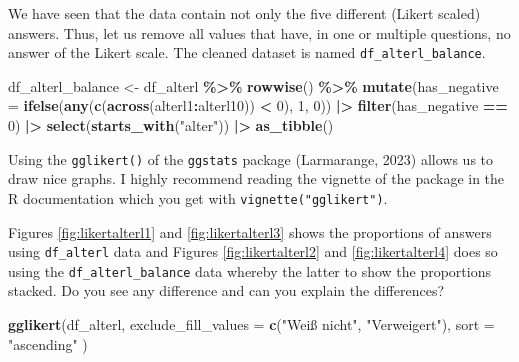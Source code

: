 \documentclass[
  doc]{apa6}
\newenvironment{Shaded}{\begin{snugshade}}{\end{snugshade}}
\newcommand{\AttributeTok}[1]{\textcolor[rgb]{0.13,0.29,0.53}{#1}}
\newcommand{\DecValTok}[1]{\textcolor[rgb]{0.00,0.00,0.81}{#1}}
\newcommand{\FunctionTok}[1]{\textcolor[rgb]{0.13,0.29,0.53}{\textbf{#1}}}
\newcommand{\NormalTok}[1]{#1}
\newcommand{\OtherTok}[1]{\textcolor[rgb]{0.56,0.35,0.01}{#1}}
\newcommand{\SpecialCharTok}[1]{\textcolor[rgb]{0.81,0.36,0.00}{\textbf{#1}}}
\newcommand{\StringTok}[1]{\textcolor[rgb]{0.31,0.60,0.02}{#1}}
\begin{document}
We have seen that the data contain not only the five different (Likert scaled) answers. Thus, let us remove all values that have, in one or multiple questions, no answer of the Likert scale. The cleaned dataset is named \texttt{df\_alterl\_balance}.

\begin{Shaded}
\begin{Highlighting}[]
\NormalTok{df\_alterl\_balance }\OtherTok{\textless{}{-}}\NormalTok{ df\_alterl }\SpecialCharTok{\%\textgreater{}\%}
  \FunctionTok{rowwise}\NormalTok{() }\SpecialCharTok{\%\textgreater{}\%}
  \FunctionTok{mutate}\NormalTok{(}\AttributeTok{has\_negative =} \FunctionTok{ifelse}\NormalTok{(}\FunctionTok{any}\NormalTok{(}\FunctionTok{c}\NormalTok{(}\FunctionTok{across}\NormalTok{(alterl1}\SpecialCharTok{:}\NormalTok{alterl10)) }\SpecialCharTok{\textless{}} \DecValTok{0}\NormalTok{), }\DecValTok{1}\NormalTok{, }\DecValTok{0}\NormalTok{)) }\SpecialCharTok{|\textgreater{}} 
  \FunctionTok{filter}\NormalTok{(has\_negative }\SpecialCharTok{==} \DecValTok{0}\NormalTok{) }\SpecialCharTok{|\textgreater{}} 
  \FunctionTok{select}\NormalTok{(}\FunctionTok{starts\_with}\NormalTok{(}\StringTok{"alter"}\NormalTok{)) }\SpecialCharTok{|\textgreater{}} 
  \FunctionTok{as\_tibble}\NormalTok{()}
\end{Highlighting}
\end{Shaded}

Using the \texttt{gglikert()} of the \texttt{ggstats} package (Larmarange, 2023) allows us to draw nice graphs. I highly recommend reading the vignette of the package in the R documentation which you get with \texttt{vignette("gglikert")}.

Figures \ref{fig:likertalterl1} and \ref{fig:likertalterl3} shows the proportions of answers using \texttt{df\_alterl} data and Figures \ref{fig:likertalterl2} and \ref{fig:likertalterl4} does so using the \texttt{df\_alterl\_balance} data whereby the latter to show the proportions stacked. Do you see any difference and can you explain the differences?

\begin{Shaded}
\begin{Highlighting}[]
\FunctionTok{gglikert}\NormalTok{(df\_alterl, }
         \AttributeTok{exclude\_fill\_values =} \FunctionTok{c}\NormalTok{(}\StringTok{"Weiß nicht"}\NormalTok{, }\StringTok{"Verweigert"}\NormalTok{),}
         \AttributeTok{sort =} \StringTok{"ascending"}
\NormalTok{         )}
\end{Highlighting}
\end{Shaded}
\end{document}
